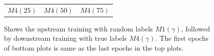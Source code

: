 \begin{figure}[h]
\begin{minipage}{0.99\columnwidth}
\begin{tabular}{ccc}
 $M4(25)$ & $M4(50)$ &  $M4(75)$
\end{tabular}
\end{minipage}
\caption{Shows the upstream training with random labels $M1(\gamma)$, followed by downstream training with true labels $M4(\gamma)$. The first epochs of bottom plots is same as the last epochs in the top plots.}
\label{fig:rand-label1}

\end{figure}


\begin{figure}[h]
\begin{minipage}{0.99\columnwidth}
\end{minipage}
\end{figure}
